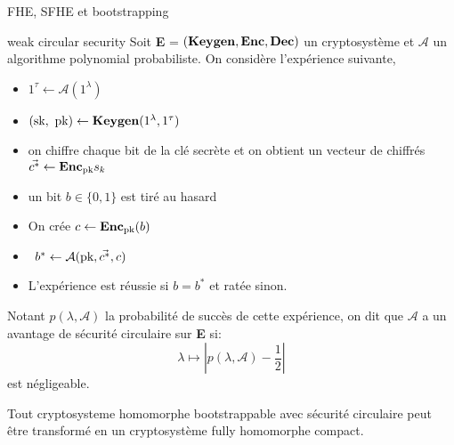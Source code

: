 \begin{section}{FHE, SFHE et bootstrapping}
\begin{definition}{weak circular security}
Soit \textbf{E} = $(\text{\textbf{Keygen}}, \text{\textbf{Enc}}, \text{\textbf{Dec}})$ un cryptosystème et $\mathcal{A}$ un
algorithme polynomial probabiliste. 
On considère l'expérience suivante, 
\begin{itemize}
\item $1^\tau \leftarrow \mathcal{A}(1^\lambda)$ 
\item $(\sk, \pk) \leftarrow \Keygen(1^\lambda, 1^\tau)$
\item on chiffre chaque bit de la clé secrète et on obtient un vecteur de
chiffrés $\vec{c^*} \leftarrow \text{\textbf{Enc}}_{\text{pk}}{s_k}$
\item un bit $b\in \{0,1\}$ est tiré au hasard
\item On crée $c \leftarrow \text{\textbf{Enc}}_{\text{pk}}(b)$ 
\item $b^* \leftarrow \mathcal{A}(\text{pk}, \vec{c^*}, c)$
\item L'expérience est réussie si $b = b^*$ et ratée sinon.
\end{itemize}
Notant $p(\lambda, \mathcal{A})$ la probabilité de succès de cette expérience, on dit
que $\mathcal{A}$ a un avantage de sécurité circulaire sur \textbf{E} si:
\[\lambda \mapsto |p(\lambda, \mathcal{A}) - \frac{1}{2}| \]
est négligeable.
\end{definition}

\begin{thm}
Tout cryptosysteme homomorphe bootstrappable avec sécurité circulaire peut être transformé en un 
cryptosystème fully homomorphe compact.
\end{thm}
\end{section}
